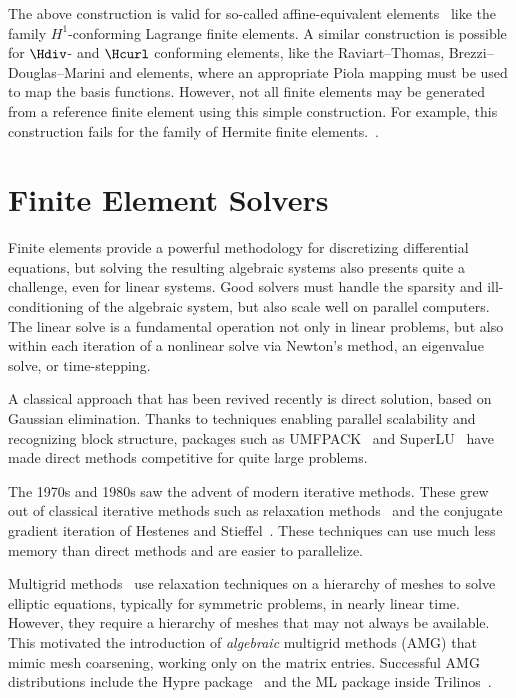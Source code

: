The above construction is valid for so-called affine-equivalent
elements~\cite{BrennerScott2008} like the family $H^1$-conforming
Lagrange finite elements. A similar construction is possible for
$\Hdiv$- and $\Hcurl$ conforming elements, like the Raviart--Thomas,
Brezzi--Douglas--Marini and \nedelec{} elements, where an appropriate
Piola mapping must be used to map the basis functions. However, not
all finite elements may be generated from a reference finite element
using this simple construction. For example, this construction fails
for the family of Hermite finite
elements.~\cite{Ciarlet2002,BrennerScott2008}.

\section{Finite Element Solvers}

Finite elements provide a powerful methodology for discretizing
differential equations, but solving the resulting algebraic systems
also presents quite a challenge, even for linear systems.  Good
solvers must handle the sparsity and ill-conditioning of the algebraic
system, but also scale well on parallel computers.  The linear solve
is a fundamental operation not only in linear problems, but also
within each iteration of a nonlinear solve via Newton's method, an
eigenvalue solve, or time-stepping.

A classical approach that has been revived recently is direct
solution, based on Gaussian elimination.  Thanks to techniques
enabling parallel scalability and recognizing block structure,
packages such as UMFPACK~\cite{Davis2004} and SuperLU~\cite{Li2005}
have made direct methods competitive for quite large problems.

The 1970s and 1980s saw the advent of modern iterative methods.  These
grew out of classical iterative methods such as relaxation
methods~\cite{missing} and the conjugate gradient iteration of
Hestenes and Stieffel~\cite{HestenesStiefel1952}. These techniques can
use much less memory than direct methods and are easier to
parallelize.


Multigrid methods~\cite{Brandt1977,Wesseling1992} use relaxation
techniques on a hierarchy of meshes to solve elliptic equations,
typically for symmetric problems, in nearly linear time.  However,
they require a hierarchy of meshes that may not always be available.
This motivated the introduction of \emph{algebraic} multigrid methods
(AMG) that mimic mesh coarsening, working only on the matrix entries.
Successful AMG distributions include the Hypre
package~\cite{FalgoutYang2002} and the ML package inside
Trilinos~\cite{HerouxBartlettHowleEtAl2005}.

